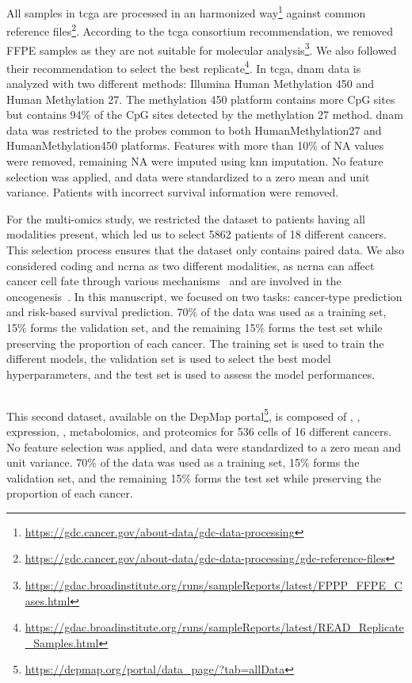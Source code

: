 \documentclass[../main.tex]{subfiles}
\begin{document}
	 All samples in \gls{tcga} are processed in an harmonized way\footnote{\url{https://gdc.cancer.gov/about-data/gdc-data-processing}} against common reference files\footnote{\url{https://gdc.cancer.gov/about-data/gdc-data-processing/gdc-reference-files}}.
	 According to the \gls{tcga} consortium recommendation, we removed FFPE samples as they are not suitable for molecular analysis\footnote{\href{https://web.archive.org/web/20150919082952/https://gdac.broadinstitute.org/runs/sampleReports/latest/FPPP_FFPE_Cases.html}{https://gdac.broadinstitute.org/runs/sampleReports/latest/FPPP\_FFPE\_Cases.html}}.
	 We also followed their recommendation to select the best replicate\footnote{\href{https://web.archive.org/web/20150919044554/http://gdac.broadinstitute.org/runs/sampleReports/latest/READ_Replicate_Samples.html}{https://gdac.broadinstitute.org/runs/sampleReports/latest/READ\_Replicate\_Samples.html}}.
	 In \gls{tcga}, \gls{dnam} data is analyzed with two different methods: Illumina Human Methylation 450 and Human Methylation 27.
	 The methylation 450 platform contains more CpG sites but contains 94\% of the CpG sites detected by the methylation 27 method.
	 \Gls{dnam} data was restricted to the probes common to both HumanMethylation27 and HumanMethylation450 platforms.
	 Features with more than 10\% of NA values were removed, remaining NA were imputed using \gls{knn} imputation.
	 No feature selection was applied, and data were standardized to a zero mean and unit variance.
	 Patients with incorrect survival information were removed.

	 For the multi-omics study, we restricted the dataset to patients having all modalities present, which led us to select 5862 patients of 18 different cancers.
	 This selection process ensures that the dataset only contains paired data.
	 We also considered coding and \gls{ncrna} as two different modalities, as \gls{ncrna} can affect cancer cell fate through various mechanisms~\cite{Grillone2020} and are involved in the oncogenesis~\cite{Toden2021}.
	 In this manuscript, we focused on two tasks: cancer-type prediction and risk-based survival prediction.
	 70\% of the data was used as a training set, 15\% forms the validation set, and the remaining 15\% forms the test set while preserving the proportion of each cancer.
	 The training set is used to train the different models, the validation set is used to select the best model hyperparameters, and the test set is used to assess the model performances.

 \subsection{}
	 This second dataset, available on the DepMap portal\footnote{\url{https://depmap.org/portal/data_page/?tab=allData}}, is composed of , ,  expression, , metabolomics, and proteomics for 536 cells of 16 different cancers.
	 No feature selection was applied, and data were standardized to a zero mean and unit variance.
	 70\% of the data was used as a training set, 15\% forms the validation set, and the remaining 15\% forms the test set while preserving the proportion of each cancer.
\end{document}
